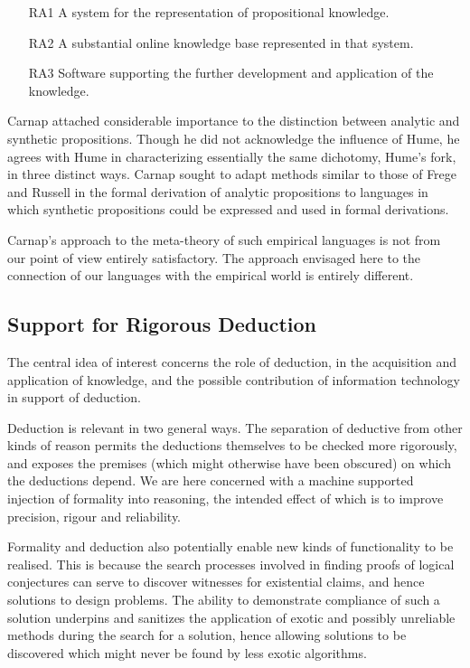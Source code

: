 \begin{itemize}
\item[RA1] A system for the representation of propositional knowledge.
\item[RA2] A substantial online knowledge base represented in that system.
\item[RA3] Software supporting the further development and application of the knowledge.
\end{itemize}

Carnap attached considerable importance to the distinction between
analytic and synthetic propositions.
Though he did not acknowledge the influence of Hume, he agrees with
Hume in characterizing essentially the same dichotomy, Hume's fork, in three
distinct ways.
Carnap sought to adapt methods similar to those of Frege and Russell
in the formal derivation of analytic propositions to languages in
which synthetic propositions could be expressed and used in formal
derivations.

Carnap's approach to the meta-theory of such empirical languages is not
from our point of view entirely satisfactory.
The approach envisaged here to the connection of our languages with
the empirical world is entirely different.

\subsection{Support for Rigorous Deduction}

The central idea of interest concerns the role of deduction, in the
acquisition and application of knowledge, and the possible
contribution of information technology in support of deduction.

Deduction is relevant in two general ways.
The separation of deductive from other kinds of reason permits the
deductions themselves to be checked more rigorously, and exposes the
premises (which might otherwise have been obscured) on which the
deductions depend.
We are here concerned with a machine supported injection of formality
into reasoning, the intended effect of which is to improve precision,
rigour and reliability.

Formality and deduction also potentially enable new kinds of
functionality to be realised.
This is because the search processes involved in finding proofs of
logical conjectures can serve to discover witnesses for existential
claims, and hence solutions to design problems.
The ability to demonstrate compliance of such a solution underpins
and sanitizes the application of exotic and possibly unreliable
methods during the search for a solution, hence allowing solutions to
be discovered which might never be found by less exotic algorithms.


